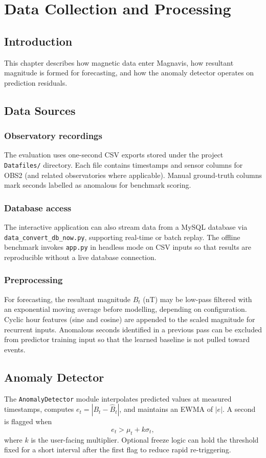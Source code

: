 \chapter{Data Collection and Processing}\doublespacing
\label{Chapter4}

\section{Introduction}
This chapter describes how magnetic data enter Magnavis, how resultant magnitude is formed for forecasting, and how the anomaly detector operates on prediction residuals.

\section{Data Sources}
\subsection{Observatory recordings}
The evaluation uses one-second CSV exports stored under the project \texttt{Datafiles/} directory. Each file contains timestamps and sensor columns for OBS2 (and related observatories where applicable). Manual ground-truth columns mark seconds labelled as anomalous for benchmark scoring.

\subsection{Database access}
The interactive application can also stream data from a MySQL database via \texttt{data\_convert\_db\_now.py}, supporting real-time or batch replay. The offline benchmark invokes \texttt{app.py} in headless mode on CSV inputs so that results are reproducible without a live database connection.

\subsection{Preprocessing}
For forecasting, the resultant magnitude $B_t$ (nT) may be low-pass filtered with an exponential moving average before modelling, depending on configuration. Cyclic hour features (sine and cosine) are appended to the scaled magnitude for recurrent inputs. Anomalous seconds identified in a previous pass can be excluded from predictor training input so that the learned baseline is not pulled toward events.

\section{Anomaly Detector}
The \texttt{AnomalyDetector} module interpolates predicted values at measured timestamps, computes $e_t = |B_t - \hat{B}_t|$, and maintains an EWMA of $|e|$. A second is flagged when
\begin{equation}
e_t > \mu_t + k \sigma_t,
\label{Eq:threshold}
\end{equation}
where $k$ is the user-facing multiplier. Optional freeze logic can hold the threshold fixed for a short interval after the first flag to reduce rapid re-triggering.

